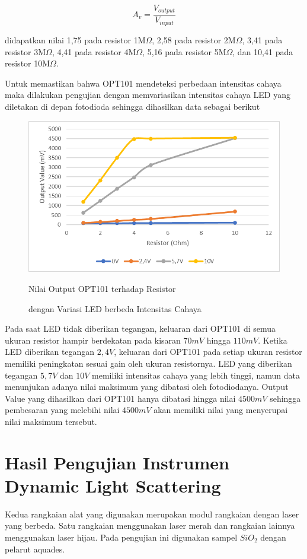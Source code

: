 \begin{equation}
  A_v = \frac{V_{output}}{V_{input}}
\end{equation}

didapatkan nilai 1,75 pada resistor 1M${\Omega}$, 2,58 pada
resistor 2M${\Omega}$, 3,41 pada resistor 3M${\Omega}$, 4,41
pada resistor 4M${\Omega}$, 5,16 pada resistor 5M${\Omega}$,
dan 10,41 pada resistor 10M${\Omega}$.

Untuk memastikan bahwa OPT101 mendeteksi perbedaan intensitas
cahaya maka dilakukan pengujian dengan memvariasikan intensitas
cahaya LED yang diletakan di depan fotodioda sehingga dihasilkan
data sebagai berikut

\begin{figure}[H]
  \centering
  \includegraphics{Images/GainWLED.png}
  \caption{Nilai Output OPT101 terhadap Resistor}
  \vspace*{1.75pt}
  \caption*{dengan Variasi LED berbeda Intensitas Cahaya}
  \label{fig:gain_led}
\end{figure}

Pada saat LED tidak diberikan tegangan, keluaran dari OPT101 di
semua ukuran resistor hampir berdekatan pada kisaran ${70mV}$
hingga ${110mV}$. Ketika LED diberikan tegangan ${2,4V}$,
keluaran dari OPT101 pada setiap ukuran resistor memiliki
peningkatan sesuai gain oleh ukuran resistornya. LED yang
diberikan tegangan ${5,7V}$ dan ${10V}$ memiliki intensitas
cahaya yang lebih tinggi, namun data menunjukan adanya nilai
maksimum yang dibatasi oleh fotodiodanya. Output Value yang
dihasilkan dari OPT101 hanya dibatasi hingga nilai ${4500mV}$
sehingga pembesaran yang melebihi nilai ${4500mV}$ akan memiliki
nilai yang menyerupai nilai maksimum tersebut.

\section{Hasil Pengujian Instrumen Dynamic Light Scattering}
Kedua rangkaian alat yang digunakan merupakan modul rangkaian
dengan laser yang berbeda. Satu rangkaian menggunakan laser
merah dan rangkaian lainnya menggunakan laser hijau. Pada
pengujian ini digunakan sampel ${SiO_2}$ dengan pelarut aquades.

